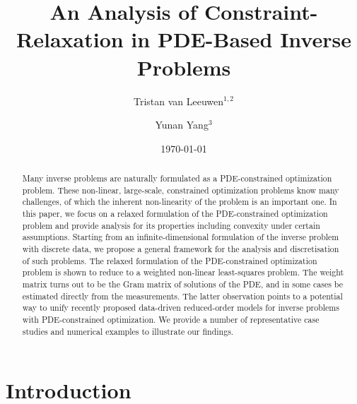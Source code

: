 \documentclass[12pt]{amsart}
\title{An Analysis of Constraint-Relaxation in PDE-Based Inverse Problems}
\author{Tristan van Leeuwen$^{1,2}$}
\author{Yunan Yang$^3$}
\date{\today}
\begin{document}
\maketitle

\begin{abstract}
{Many inverse problems are naturally formulated as a PDE-constrained optimization problem.} These non-linear, large-scale, constrained optimization problems know many challenges, of which the inherent non-linearity of the problem is an important one. {In this paper, we focus on a relaxed formulation of the PDE-constrained optimization problem and provide analysis for its properties including convexity under certain assumptions.} Starting from an infinite-dimensional formulation of the inverse problem with discrete data, we propose a general framework for the analysis and discretisation of such problems. The relaxed formulation of the PDE-constrained optimization problem is shown to reduce to a weighted non-linear least-squares problem. The weight matrix turns out to be the Gram matrix of solutions of the PDE, and in some cases be estimated directly from the measurements. The latter observation points to a potential way to unify recently proposed data-driven reduced-order models for inverse problems with PDE-constrained optimization. We provide a number of representative case studies and numerical examples to illustrate our findings.
\end{abstract}

\section{Introduction}

\end{document}
